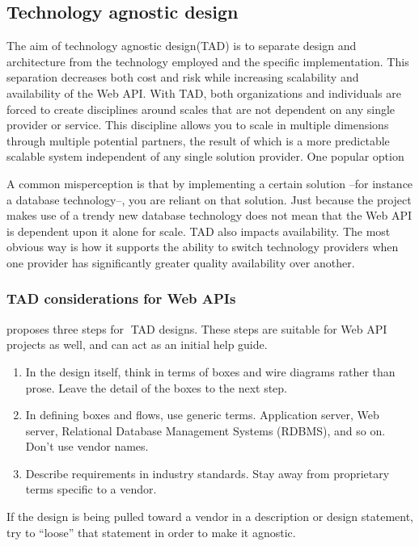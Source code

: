 \documentclass[10pt,article]{IEEEtran}
\begin{document}
\subsection{Technology agnostic design}
The aim of technology agnostic design(TAD) is to separate design and architecture from the technology employed and the specific implementation. This separation decreases both cost and risk while increasing scalability and availability of the Web API.
With TAD, both organizations and individuals are forced to create disciplines around scales that are not dependent on any single provider or service. This discipline allows you to scale in multiple dimensions through multiple potential partners, the result of which is a more predictable scalable system independent of any single solution provider. One popular option 

A common misperception is that by implementing a certain solution --for instance a database technology--, you are reliant on that solution. Just because the project makes use of a trendy new database technology does not mean that the Web API is dependent upon it alone for scale. TAD also impacts availability. The most obvious way is how it supports the ability to switch technology providers when one provider has significantly greater quality availability over another. \cite{artofscalability}

\subsubsection{TAD considerations for Web APIs} \cite{artofscalability} proposes three steps for TAD designs. These steps are suitable for Web API projects as well, and can act as an initial help guide.

\begin{enumerate}
    \item
    In the design itself, think in terms of boxes and wire diagrams rather than prose. Leave the detail of the boxes to the next step.
    \item
    In defining boxes and flows, use generic terms. Application server, Web server, Relational Database Management Systems (RDBMS), and so on. Don't use vendor names.
    \item
    Describe requirements in industry standards. Stay away from proprietary terms specific to a vendor.  
\end{enumerate}

If the design is being pulled toward a vendor in a description or design statement, try to ``loose'' that statement in order to make it agnostic.
\end{document}
